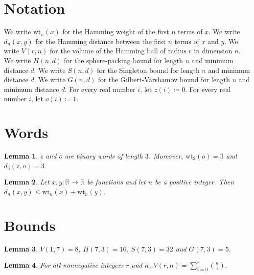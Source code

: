 \documentclass{article}
\newtheorem{lemma}{Lemma}
\begin{document}
\section{Notation}

We write $\mathrm{wt}_n(x)$ for the Hamming weight of the first $n$ terms of $x$.
We write $d_n(x,y)$ for the Hamming distance between the first $n$ terms of $x$ and $y$.
We write $V(r,n)$ for the volume of the Hamming ball of radius $r$ in dimension $n$.
We write $H(n,d)$ for the sphere-packing bound for length $n$ and minimum distance $d$.
We write $S(n,d)$ for the Singleton bound for length $n$ and minimum distance $d$.
We write $G(n,d)$ for the Gilbert-Varshamov bound for length $n$ and minimum distance $d$.
For every real number $i$, let $z(i)\coloneqq 0$.
For every real number $i$, let $o(i)\coloneqq 1$.

\section{Words}

\begin{lemma}\label{words}
$z$ and $o$ are binary words of length $3$. Moreover, $\mathrm{wt}_3(o)=3$ and $d_3(z,o)=3$.
\end{lemma}

\begin{lemma}\label{triangle}
Let $x,y:\mathbb{R}\to\mathbb{R}$ be functions and let $n$ be a positive integer. Then $d_n(x,y)\le\mathrm{wt}_n(x)+\mathrm{wt}_n(y)$.
\end{lemma}

\section{Bounds}

\begin{lemma}\label{hamming}
$V(1,7)=8$, $H(7,3)=16$, $S(7,3)=32$ and $G(7,3)=5$.
\end{lemma}

\begin{lemma}\label{ball}
For all nonnegative integers $r$ and $n$, $V(r,n)=\sum_{i=0}^{r}\binom{n}{i}$.
\end{lemma}
\end{document}
